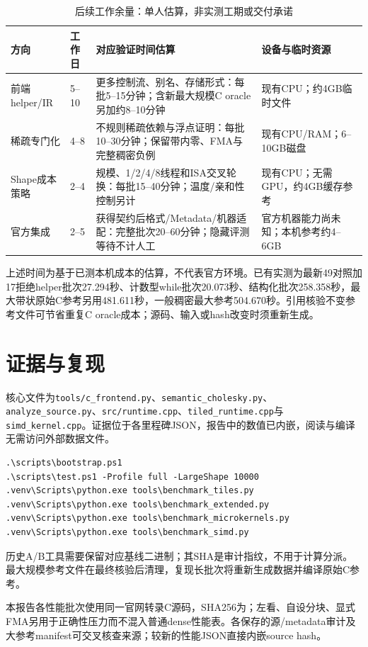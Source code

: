 \documentclass[UTF8,a4paper,11pt]{ctexart}
\begin{document}
\begin{table}[htbp]\centering\small
\setlength{\tabcolsep}{3pt}
\caption{后续工作余量：单人估算，非实测工期或交付承诺}
\begin{tabular}{@{}p{29mm}p{16mm}p{63mm}p{40mm}@{}}\toprule
方向&工作日&对应验证时间估算&设备与临时资源\\\midrule
前端helper/IR&5--10&更多控制流、别名、存储形式：每批5--15分钟；含新最大规模C oracle另加约8--10分钟&现有CPU；约4GB临时文件\\
稀疏专门化&4--8&不规则稀疏依赖与浮点证明：每批10--30分钟；保留带内零、FMA与完整稠密负例&现有CPU/RAM；6--10GB磁盘\\
Shape成本策略&2--4&规模、1/2/4/8线程和ISA交叉轮换：每批15--40分钟；温度/亲和性控制另计&现有CPU；无需GPU，约4GB缓存参考\\
官方集成&2--5&获得契约后格式/Metadata/机器适配：完整批次20--60分钟；隐藏评测等待不计人工&官方机器能力尚未知；本机参考约4--6GB\\\bottomrule
\end{tabular}
\end{table}
上述时间为基于已测本机成本的估算，不代表官方环境。已有实测为最新49对照加17拒绝helper批次27.294秒、计数型while批次20.073秒、结构化批次258.358秒，最大带状原始C参考另用481.611秒，一般稠密最大参考504.670秒。引用核验不变参考文件可节省重复C oracle成本；源码、输入或hash改变时须重新生成。

\appendix
\section{证据与复现}
核心文件为\texttt{tools/c\_frontend.py}、\texttt{semantic\_cholesky.py}、\texttt{analyze\_source.py}、\texttt{src/runtime.cpp}、\texttt{tiled\_runtime.cpp}与\texttt{simd\_kernel.cpp}。证据位于各里程碑JSON，报告中的数值已内嵌，阅读与编译无需访问外部数据文件。
\begin{verbatim}
.\scripts\bootstrap.ps1
.\scripts\test.ps1 -Profile full -LargeShape 10000
.venv\Scripts\python.exe tools\benchmark_tiles.py
.venv\Scripts\python.exe tools\benchmark_extended.py
.venv\Scripts\python.exe tools\benchmark_microkernels.py
.venv\Scripts\python.exe tools\benchmark_simd.py
\end{verbatim}
历史A/B工具需要保留对应基线二进制；其SHA是审计指纹，不用于计算分派。最大规模参考文件在最终核验后清理，复现长批次将重新生成数据并编译原始C参考。

本报告各性能批次使用同一官网转录C源码，SHA256为；左看、自设分块、显式FMA另用于正确性压力而不混入普通dense性能表。各保存的源/metadata审计及大参考manifest可交叉核查来源；较新的性能JSON直接内嵌source hash。
\end{document}
